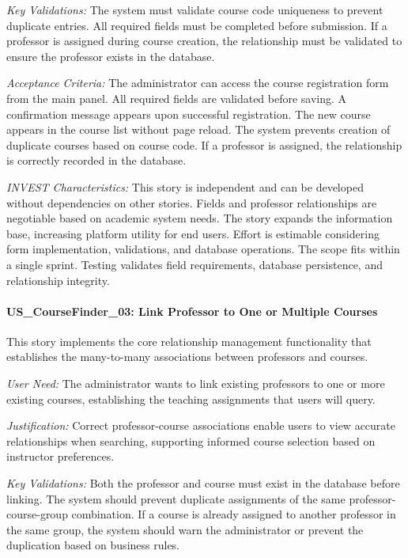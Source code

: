 \documentclass[12pt,a4paper]{article}
\begin{document}
\textit{Key Validations:} The system must validate course code uniqueness to prevent duplicate entries. All required fields must be completed before submission. If a professor is assigned during course creation, the relationship must be validated to ensure the professor exists in the database.\newline

\textit{Acceptance Criteria:} The administrator can access the course registration form from the main panel. All required fields are validated before saving. A confirmation message appears upon successful registration. The new course appears in the course list without page reload. The system prevents creation of duplicate courses based on course code. If a professor is assigned, the relationship is correctly recorded in the database.\newline

\textit{INVEST Characteristics:} This story is independent and can be developed without dependencies on other stories. Fields and professor relationships are negotiable based on academic system needs. The story expands the information base, increasing platform utility for end users. Effort is estimable considering form implementation, validations, and database operations. The scope fits within a single sprint. Testing validates field requirements, database persistence, and relationship integrity.\newline

\paragraph{US\_CourseFinder\_03: Link Professor to One or Multiple Courses}

This story implements the core relationship management functionality that establishes the many-to-many associations between professors and courses.\newline

\textit{User Need:} The administrator wants to link existing professors to one or more existing courses, establishing the teaching assignments that users will query.\newline

\textit{Justification:} Correct professor-course associations enable users to view accurate relationships when searching, supporting informed course selection based on instructor preferences.\newline

\textit{Key Validations:} Both the professor and course must exist in the database before linking. The system should prevent duplicate assignments of the same professor-course-group combination. If a course is already assigned to another professor in the same group, the system should warn the administrator or prevent the duplication based on business rules.\newline
\end{document}
